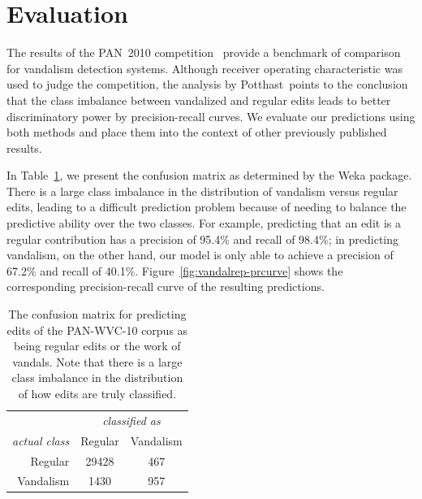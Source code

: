 \section{Evaluation}

The results of the PAN~2010 competition~\cite{Potthast2010b}
provide a benchmark of comparison for vandalism detection systems.
Although receiver operating characteristic was used to judge the
competition, the analysis by Potthast~\etal points to the conclusion
that the class imbalance between vandalized and regular edits
leads to better discriminatory power by precision-recall curves.
We evaluate our predictions using both methods and place them into
the context of other previously published results.

In Table~\ref{tab:vandalrep-confusion}, we present the confusion matrix
as determined by the Weka package.
There is a large class imbalance in the distribution of vandalism versus
regular edits, leading to a difficult prediction problem because of
needing to balance the predictive ability over the two classes.
For example, predicting that an edit is a regular contribution has a
precision of 95.4\% and recall of 98.4\%;
in predicting vandalism, on the other hand, our model is only able
to achieve a precision of 67.2\% and recall of 40.1\%.
Figure~\ref{fig:vandalrep-prcurve} shows the corresponding
precision-recall curve of the resulting predictions.

\begin{table}[tbph]
  \begin{center}
    \begin{tabular}{| r | c c |}
      \hline
          & \multicolumn{2}{c|}{\textit{classified as}} \\
      \textit{actual class} & Regular & Vandalism \\
          \cline{2-3}
      Regular & 29428 & 467 \\
      Vandalism & 1430 & 957 \\
      \hline
    \end{tabular}
  \end{center}
  \caption[Confusion matrix for vandalism prediction]{%
    The confusion matrix for predicting edits of the PAN-WVC-10
    corpus as being regular edits or the work of vandals.
    Note that there is a large class imbalance in the distribution
    of how edits are truly classified.}
  \label{tab:vandalrep-confusion}
\end{table}

